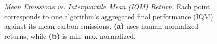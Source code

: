 \begin{figure} 
	\centering
	\quad
	\caption{\emph{Mean Emissions vs. Interquartile Mean (IQM) Return.}
		Each point corresponds to one algorithm’s aggregated final performance (IQM) against its mean carbon emissions. 
		\textbf{(a)} uses human‐normalized returns, while \textbf{(b)} is min--max normalized.}
	\label{fig:scatter_emissions_a}
\end{figure}

